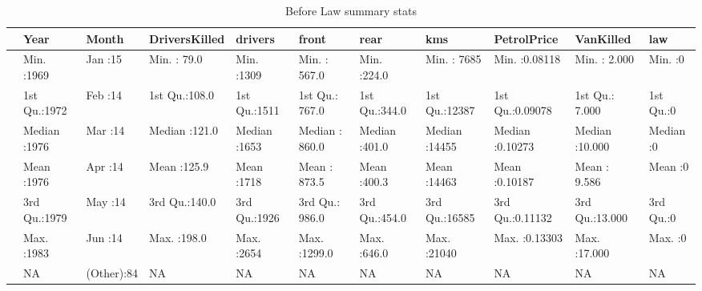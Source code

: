 \documentclass[11pt,a4paper,]{article}
\begin{document}
\begin{table}

\caption{\label{tab:Beforelawsub}Before Law summary stats}
\centering
\begin{tabular}[t]{l|l|l|l|l|l|l|l|l|l|l}
\hline
  &      Year &     Month & DriversKilled &    drivers &     front &      rear &      kms &  PetrolPrice &   VanKilled &      law\\
\hline
 & Min.   :1969 & Jan    :15 & Min.   : 79.0 & Min.   :1309 & Min.   : 567.0 & Min.   :224.0 & Min.   : 7685 & Min.   :0.08118 & Min.   : 2.000 & Min.   :0\\
\hline
 & 1st Qu.:1972 & Feb    :14 & 1st Qu.:108.0 & 1st Qu.:1511 & 1st Qu.: 767.0 & 1st Qu.:344.0 & 1st Qu.:12387 & 1st Qu.:0.09078 & 1st Qu.: 7.000 & 1st Qu.:0\\
\hline
 & Median :1976 & Mar    :14 & Median :121.0 & Median :1653 & Median : 860.0 & Median :401.0 & Median :14455 & Median :0.10273 & Median :10.000 & Median :0\\
\hline
 & Mean   :1976 & Apr    :14 & Mean   :125.9 & Mean   :1718 & Mean   : 873.5 & Mean   :400.3 & Mean   :14463 & Mean   :0.10187 & Mean   : 9.586 & Mean   :0\\
\hline
 & 3rd Qu.:1979 & May    :14 & 3rd Qu.:140.0 & 3rd Qu.:1926 & 3rd Qu.: 986.0 & 3rd Qu.:454.0 & 3rd Qu.:16585 & 3rd Qu.:0.11132 & 3rd Qu.:13.000 & 3rd Qu.:0\\
\hline
 & Max.   :1983 & Jun    :14 & Max.   :198.0 & Max.   :2654 & Max.   :1299.0 & Max.   :646.0 & Max.   :21040 & Max.   :0.13303 & Max.   :17.000 & Max.   :0\\
\hline
 & NA & (Other):84 & NA & NA & NA & NA & NA & NA & NA & NA\\
\hline
\end{tabular}
\end{table}
\end{document}
